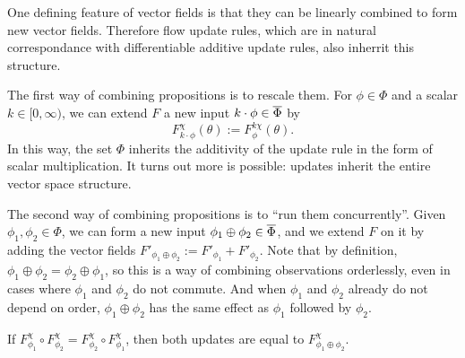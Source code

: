 One defining feature of vector fields is that they
can be linearly combined to form new vector fields.
Therefore flow update rules, which are in natural correspondance with differentiable additive update rules, also inherrit this structure.

The first way of combining propositions is to rescale them.
For $\phi \in \Phi$ and a scalar $k \in [0,\infty)$, 
we can extend $F$ a new input $k \cdot \phi \in \overline \Phi$ by
\[
	F^{\chi}_{k\cdot\phi}(\theta) := F^{k\chi}_{\phi}(\theta).
\]
In this way, the set $\Phi$ inherits 
the additivity of the update rule in the form of scalar multiplication.
It turns out more is possible: updates inherit the entire vector space structure.


The second way of combining propositions is to ``run them concurrently''.
Given $\phi_1, \phi_2 \in \Phi$, we can form a new input 
$\phi_1 \oplus \phi_2 \in \overline \Phi$, and we extend $F$ on it by
adding the vector fields
$F'_{\phi_1 \oplus \phi_2} := F'_{\phi_1} + F'_{\phi_2}$.
Note that by definition, $\phi_1 \oplus \phi_2 = \phi_2 \oplus \phi_1$,
so this is a way of combining observations orderlessly, even in cases
where $\phi_1$ and $\phi_2$ do not commute. And when $\phi_1$ and $\phi_2$
already do not depend on order, $\phi_1\oplus \phi_2$ has the same effect
as $\phi_1$ followed by $\phi_2$.

\begin{prop}
	If $F^{\chi}_{\phi_1} \circ F^{\chi}_{\phi_2} =
	 	F^{\chi}_{\phi_2} \circ F^{\chi}_{\phi_1}$,
	then both updates are equal to $F^{\chi}_{\phi_1 \oplus \phi_2}$.
\end{prop}


